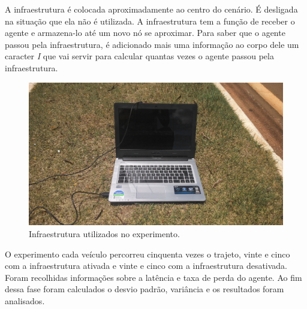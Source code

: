 A infraestrutura é colocada aproximadamente ao centro do cenário. É desligada na situação que ela não é utilizada. A infraestrutura tem a função de receber o agente e armazena-lo até um novo nó se aproximar. Para saber que o agente passou pela infraestrutura, é adicionado mais uma informação ao corpo dele um caracter \emph{I} que vai servir para calcular quantas vezes o agente passou pela infraestrutura.

\begin{figure}[htbp]
	\centering
	\includegraphics[scale=0.06]{metodologia/figuras/infraestruturaUtilizadoExperimento.jpg}
	\caption{Infraestrutura utilizados no experimento.}
	\label{fig:infraestruturaUtilizadoExperimento}
\end{figure}

O experimento cada veículo percorreu cinquenta vezes o trajeto, vinte e cinco com a infraestrutura ativada e vinte e cinco com a infraestrutura desativada. Foram recolhidas informações sobre a latência e taxa de perda do agente. Ao fim dessa fase foram calculados o desvio padrão, variância e os resultados foram analisados.